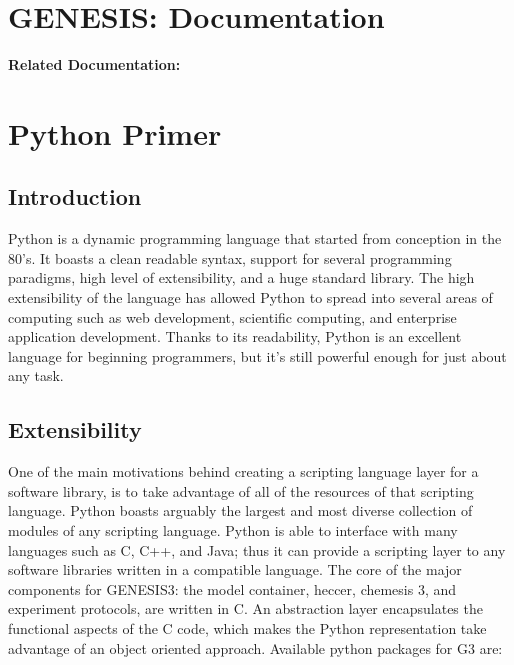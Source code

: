 \documentclass[12pt]{article}
\begin{document}
\section*{GENESIS: Documentation}

{\bf Related Documentation:}

\section*{Python Primer}


\subsection*{Introduction}

Python is a dynamic programming language that started from conception in the 80's. It boasts a clean readable syntax, support for several programming paradigms, high level of extensibility, and a huge standard library. The high extensibility of the language has allowed Python to spread into several areas of computing such as web development, scientific computing, and enterprise application development. Thanks to its readability, Python is an excellent language for beginning programmers, but it's still powerful enough for just about any task.

\subsection*{Extensibility}

One of the main motivations behind creating a scripting language layer for a software library, is to take advantage of all of the resources of that scripting language. Python boasts arguably the largest and most diverse collection of modules of any scripting language. Python is able to interface with many languages such as C, C++, and Java; thus it can provide a scripting layer to any software libraries written in a compatible language. The core of the major components for GENESIS3: the model container, heccer, chemesis 3, and experiment protocols, are written in C. An abstraction layer encapsulates the functional aspects of the C code, which makes the Python representation take advantage of an object oriented approach. Available python packages for G3 are: 
\end{document}
